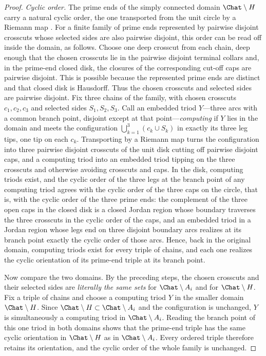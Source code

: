 \begin{proof}
\emph{Cyclic order.}
The prime ends of the simply connected domain $\Chat\setminus H$ carry a
natural cyclic order, the one transported from the unit circle by a
Riemann map \cite{Pom92}.  For a finite family of prime ends represented
by pairwise disjoint crosscuts whose selected sides are also pairwise
disjoint, this order can be read off inside the domain, as follows.
Choose one deep crosscut from each chain, deep enough that the chosen
crosscuts lie in the pairwise disjoint terminal collars and, in the
prime-end closed disk, the closures of the corresponding cut-off caps are
pairwise disjoint.  This is possible because the represented prime ends
are distinct and that closed disk is Hausdorff.  Thus the chosen crosscuts
and selected sides are pairwise disjoint.  Fix three chains of the family, with chosen crosscuts
$c_1,c_2,c_3$ and selected sides $S_1,S_2,S_3$.  Call an embedded triod
$Y$---three arcs with a common branch point, disjoint except at that
point---\emph{computing} if $Y$ lies in the domain and meets the
configuration $\bigcup_{k=1}^{3}(c_k\cup S_k)$ in exactly its three leg
tips, one tip on each $c_k$.  Transporting by a Riemann map turns the
configuration into three pairwise disjoint crosscuts of the unit disk
cutting off pairwise disjoint caps, and a computing triod into an
embedded triod tipping on the three crosscuts and otherwise avoiding
crosscuts and caps.  In the disk, computing triods exist, and the cyclic
order of the three legs at the branch point of any computing triod
agrees with the cyclic order of the three caps on the circle, that is,
with the cyclic order of the three prime ends: the complement of the
three open caps in the closed disk is a closed Jordan region whose
boundary traverses the three crosscuts in the cyclic order of the caps,
and an embedded triod in a Jordan region whose legs end on three
disjoint boundary arcs realizes at its branch point exactly the cyclic
order of those arcs.  Hence, back in the original domain, computing
triods exist for every triple of chains, and each one realizes the
cyclic orientation of its prime-end triple at its branch point.

Now compare the two domains.  By the preceding steps, the chosen
crosscuts and their selected sides are \emph{literally the same sets}
for $\Chat\setminus A_i$ and for $\Chat\setminus H$.  Fix a triple of
chains and choose a computing triod $Y$ in the smaller domain
$\Chat\setminus H$.  Since $\Chat\setminus H\subset\Chat\setminus A_i$
and the configuration is unchanged, $Y$ is simultaneously a computing
triod in $\Chat\setminus A_i$.  Reading the branch point of this one
triod in both domains shows that the prime-end triple has the same
cyclic orientation in $\Chat\setminus H$ as in $\Chat\setminus A_i$.
Every ordered triple therefore retains its orientation, and the cyclic
order of the whole family is unchanged.
\end{proof}

